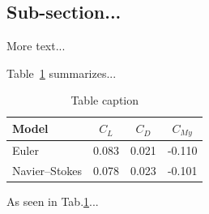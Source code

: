 \subsection{Sub-section...}

More text...

Table~\ref{table:simple} summarizes...

\begin{table}[!h]
  \begin{center}
    \begin{tabular}{lccc}
      Model           & $C_L$ & $C_D$ & $C_{M y}$ \\
      \hline
      Euler           & 0.083 & 0.021 & -0.110    \\
      Navier--Stokes  & 0.078 & 0.023 & -0.101    \\
      \hline
    \end{tabular}
  \end{center}
  \caption[Table caption shown in TOC]{Table caption}
  \label{table:simple}
\end{table}

As seen in Tab.\ref{table:simple}...

